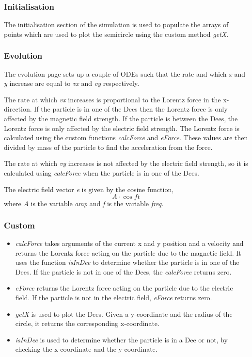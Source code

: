 \documentclass[11pt]{article}
\begin{document}
\subsubsection*{Initialisation}
\label{sec-1-3-2}

The initialisation section of the simulation is used to populate the
arrays of points which are used to plot the semicircle using the
custom method \emph{getX}.
\subsubsection*{Evolution}
\label{sec-1-3-3}

The evolution page sets up a couple of ODEs such that the rate and which \emph{x} and \emph{y} increase are equal to \emph{vx} and \emph{vy} respectively.

The rate at which \emph{vx} increases is proportional to the Lorentz force in the
x-direction. If the particle is in one of the Dees then the Lorentz
force is only affected by the magnetic field strength. If the particle
is between the Dees, the Lorentz force is only affected by the
electric field strength. The Lorentz force is calculated using the
custom functions \emph{calcForce} and \emph{eForce}. These values are then
divided by mass of the particle to find the acceleration from the
force.

The rate at which \emph{vy} increases is not affected by the electric field
strength, so it is calculated using \emph{calcForce} when the particle is
in one of the Dees.

The electric field vector \emph{e} is given by the cosine
function, \[ A\cdot\cos{f t} \] where \emph{A} is the variable \emph{amp} and
\emph{f} is the variable \emph{freq}.
\subsubsection*{Custom}
\label{sec-1-3-4}

\begin{itemize}
\item \emph{calcForce} takes arguments of the current x and y position and a
  velocity and returns the Lorentz force acting on the particle due to
  the magnetic field. It uses the function \emph{isInDee} to determine
  whether the particle is in one of the Dees. If the particle is not
  in one of the Dees, the \emph{calcForce} returns zero.
\item \emph{eForce} returns the Lorentz force acting on the particle due to the
  electric field. If the particle is not in the electric field,
  \emph{eForce} returns zero.
\item \emph{getX} is used to plot the Dees. Given a y-coordinate and the radius
  of the circle, it returns the corresponding x-coordinate.
\item \emph{isInDee} is used to determine whether the particle is in a Dee or
  not, by checking the x-coordinate and the y-coordinate.
\end{itemize}
\end{document}
